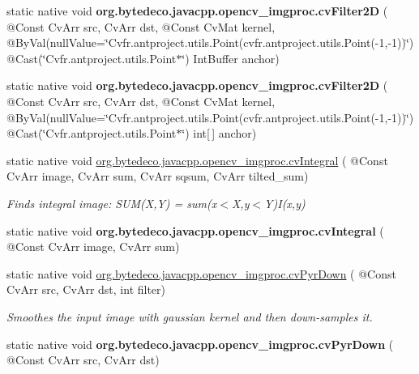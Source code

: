 \begin{DoxyCompactItemize}
\item 
\mbox{\label{group__imgproc__c_ga190132c0c926ab198bcfd73d4b9da2fc}} 
static native void {\bfseries org.\+bytedeco.\+javacpp.\+opencv\+\_\+imgproc.\+cv\+Filter2D} ( @Const Cv\+Arr src, Cv\+Arr dst, @Const Cv\+Mat kernel, @By\+Val(null\+Value=\char`\"{}Cv\+fr.antproject.utils.Point(cv\+fr.antproject.utils.Point(-\/1,-\/1))\char`\"{}) @Cast(\char`\"{}Cv\+fr.antproject.utils.Point$\ast$\char`\"{}) Int\+Buffer anchor)
\item 
\mbox{\label{group__imgproc__c_gab159c64874a229b673570dc33f6c9634}} 
static native void {\bfseries org.\+bytedeco.\+javacpp.\+opencv\+\_\+imgproc.\+cv\+Filter2D} ( @Const Cv\+Arr src, Cv\+Arr dst, @Const Cv\+Mat kernel, @By\+Val(null\+Value=\char`\"{}Cv\+fr.antproject.utils.Point(cv\+fr.antproject.utils.Point(-\/1,-\/1))\char`\"{}) @Cast(\char`\"{}Cv\+fr.antproject.utils.Point$\ast$\char`\"{}) int\mbox{[}$\,$\mbox{]} anchor)
\item 
static native void \hyperlink{group__imgproc__c_ga08246108002aef3cbe4402ee61232191}{org.\+bytedeco.\+javacpp.\+opencv\+\_\+imgproc.\+cv\+Integral} ( @Const Cv\+Arr image, Cv\+Arr sum, Cv\+Arr sqsum, Cv\+Arr tilted\+\_\+sum)
\begin{DoxyCompactList}\small\item\em Finds integral image\+: S\+U\+M(\+X,\+Y) = sum(x$<$\+X,y$<$\+Y)I(x,y) \end{DoxyCompactList}\item 
\mbox{\label{group__imgproc__c_gafaec33a568938bbea8185145e2bbe1a0}} 
static native void {\bfseries org.\+bytedeco.\+javacpp.\+opencv\+\_\+imgproc.\+cv\+Integral} ( @Const Cv\+Arr image, Cv\+Arr sum)
\item 
static native void \hyperlink{group__imgproc__c_ga728d5076e2233678be83cad3203472f9}{org.\+bytedeco.\+javacpp.\+opencv\+\_\+imgproc.\+cv\+Pyr\+Down} ( @Const Cv\+Arr src, Cv\+Arr dst, int filter)
\begin{DoxyCompactList}\small\item\em Smoothes the input image with gaussian kernel and then down-\/samples it. \end{DoxyCompactList}\item 
\mbox{\label{group__imgproc__c_ga5f9b69c51b9d59156410798cbcde39c7}} 
static native void {\bfseries org.\+bytedeco.\+javacpp.\+opencv\+\_\+imgproc.\+cv\+Pyr\+Down} ( @Const Cv\+Arr src, Cv\+Arr dst)

\end{DoxyCompactItemize}
